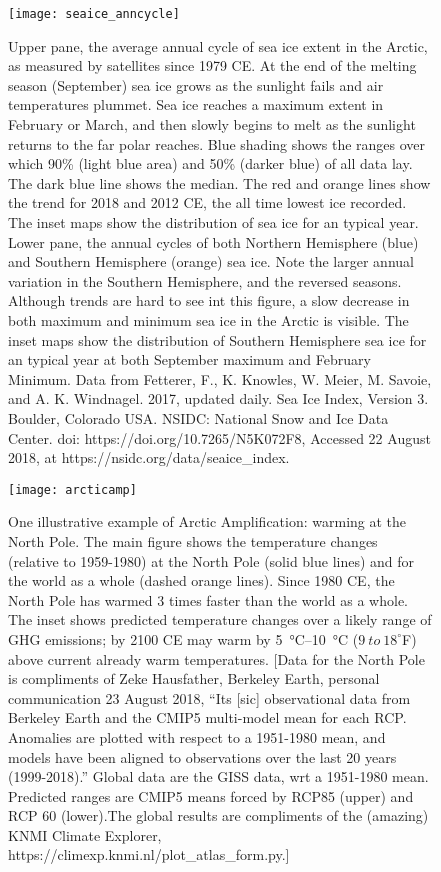 \begin{figure}[p]
	\centering
  \texttt{[image: seaice\_anncycle]}%
	\caption{Upper pane, the average annual cycle of sea ice extent in the Arctic, as measured by satellites since 1979 CE. At the end of the melting season (September) sea ice grows as the sunlight fails and air temperatures plummet. Sea ice reaches a maximum extent in February or March, and then slowly begins to melt as the sunlight returns to the far polar reaches. Blue shading shows the ranges over which 90\% (light blue area) and 50\% (darker blue) of all data lay. The dark blue line shows the median. The red and orange lines show the trend for 2018 and 2012 CE, the all time lowest ice recorded. The inset maps show the distribution of sea ice for an typical year. Lower pane, the annual cycles of both Northern Hemisphere (blue) and Southern Hemisphere (orange) sea ice. Note the larger annual variation in the Southern Hemisphere, and the reversed seasons. Although trends are hard to see int this figure, a slow decrease in both maximum and minimum sea ice in the Arctic is visible. The inset maps show the distribution of Southern Hemisphere sea ice for an typical year at both September maximum and February Minimum. Data from Fetterer, F., K. Knowles, W. Meier, M. Savoie, and A. K. Windnagel. 2017, updated daily. Sea Ice Index, Version 3. Boulder, Colorado USA. NSIDC: National Snow and Ice Data Center. doi: https://doi.org/10.7265/N5K072F8, Accessed 22 August 2018, at https://nsidc.org/data/seaice\_index.}
	\label{fig:seaice_anncycle}
\end{figure}

\begin{figure}[p]
	\centering
  \texttt{[image: arcticamp]}%
	\caption{One illustrative example of Arctic Amplification: warming at the North Pole. The main figure shows the temperature changes (relative to 1959-1980) at the North Pole (solid blue lines) and for the world as a whole (dashed orange lines). Since 1980 CE, the North Pole has warmed 3 times faster than the world as a whole. The inset shows predicted temperature changes over a likely range of GHG emissions; by 2100 CE may warm by \SIrange{5}{10}{\celsius} ($9\ to\ 18^{\circ}$F) above current already warm temperatures. [Data for the North Pole is compliments of Zeke Hausfather, Berkeley Earth, personal communication 23 August 2018, ``Its [sic] observational data from Berkeley Earth and the CMIP5 multi-model mean for each RCP. Anomalies are plotted with respect to a 1951-1980 mean, and models have been aligned to observations over the last 20 years (1999-2018).'' Global data are the GISS data, wrt a 1951-1980 mean. Predicted ranges are CMIP5 means forced by RCP85 (upper) and RCP 60 (lower).The global results are compliments of the (amazing) KNMI Climate Explorer, https://climexp.knmi.nl/plot\_atlas\_form.py.]}
	\label{fig:aa}
\end{figure}



